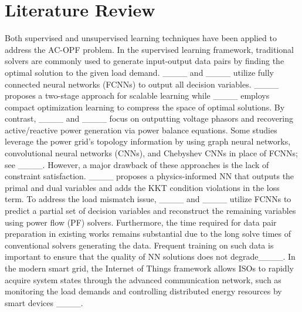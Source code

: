 \section{Literature Review}
Both supervised and unsupervised learning techniques have been applied to address the AC-OPF problem. In the supervised learning framework, traditional solvers are commonly used to generate input-output data pairs by finding the optimal solution to the given load demand. ____ and ____ utilize fully connected neural networks (FCNNs) to output all decision variables. ____ proposes a two-stage approach for scalable learning while ____ employs compact optimization learning to compress the space of optimal solutions. By contrast, ____ and ____ focus on outputting voltage phasors and recovering active/reactive power generation via power balance equations. Some studies leverage the power grid's topology information by using graph neural networks, convolutional neural networks (CNNs), and Chebyshev CNNs in place of FCNNs; see ____. However, a major drawback of these approaches is the lack of constraint satisfaction. ____ proposes a physics-informed NN that outputs the primal and dual variables and adds the KKT condition violations in the loss term. To address the load mismatch issue, ____ and ____ utilize FCNNs to predict a partial set of decision variables and reconstruct the remaining variables using power flow (PF) solvers. Furthermore, the time required for data pair preparation in existing works remains substantial due to the long solve times of conventional solvers generating the data. Frequent training on such data is important to ensure that the quality of NN solutions does not degrade____. In the modern smart grid, the Internet of Things framework allows ISOs to rapidly acquire system states through the advanced communication network, such as monitoring the load demands and controlling distributed energy resources by smart devices ____.

